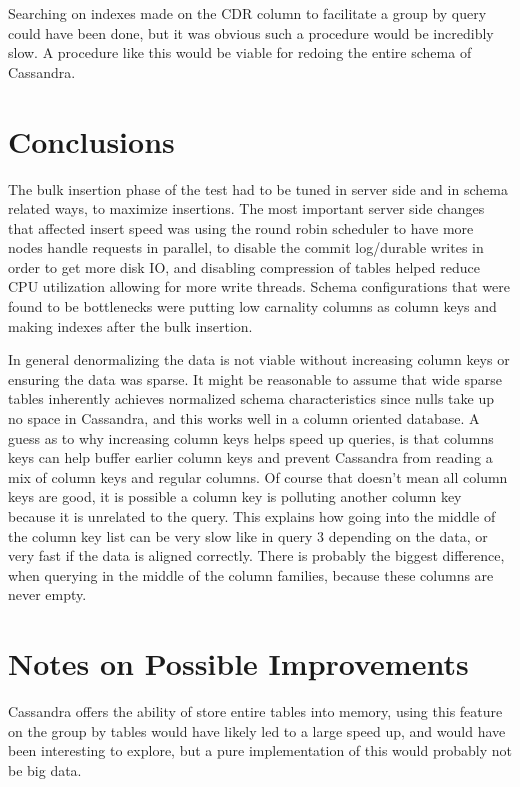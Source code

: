 \documentclass[letterpaper]{article}
\begin{document}
Searching on indexes made on the CDR column to facilitate a group by query could have been done, but
it was obvious such a procedure would be incredibly slow. A procedure like this would be viable for 
redoing the entire schema of Cassandra.

\section{Conclusions}

The bulk insertion phase of the test had to be tuned in server side and in schema related ways, to maximize
insertions.
The most important server side changes that affected insert speed was using the round
robin scheduler to have more nodes handle requests in parallel, to disable
the commit log/durable writes in order to get more disk IO, and disabling compression of tables helped
reduce CPU utilization allowing for more write threads. Schema configurations that were found to be
bottlenecks were putting low carnality columns as column keys and making indexes after the bulk 
insertion.

In general denormalizing the data is not viable without increasing column keys or ensuring the data
was sparse. It might be reasonable to assume that wide sparse tables inherently achieves normalized
schema characteristics since nulls take up no space in Cassandra, and this works well in a column 
oriented database. 
A guess as to why increasing column keys helps speed up queries, is that columns keys can help buffer
earlier column keys and prevent Cassandra from reading a mix of column keys and regular columns.
Of course that doesn't mean all column keys are good, it is possible a column key is polluting
another column key because it is unrelated to the query. This explains how going into the middle of
the column key list can be very slow like in query 3 depending on the data, or very fast if the data
is aligned correctly. There is probably the biggest difference, when querying in the middle of the
column families, because these columns are never empty. 

\section{Notes on Possible Improvements}

Cassandra offers the ability of store entire tables into memory, using this feature on the
group by tables would have likely led to a large speed up, and would have been
interesting to explore, but a pure implementation of this would probably not be big data.
\end{document}
